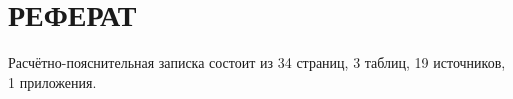 \chapter*{РЕФЕРАТ}

Расчётно-пояснительная записка состоит из 34 страниц, 3 таблиц, 19 источников, 1 приложения.
